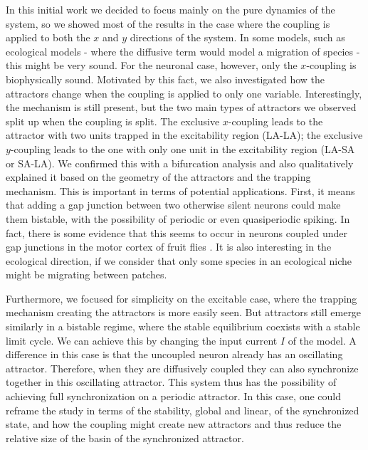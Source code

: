 In this initial work we decided to focus mainly on the pure dynamics of the system, so we showed most of the results in the case where the coupling is applied to both the $x$ and $y$ directions of the system. In some models, such as ecological models - where the diffusive term would model a migration of species - this might be very sound. For the neuronal case, however, only the $x$-coupling is biophysically sound. Motivated by this fact, we also investigated how the attractors change when the coupling is applied to only one variable. Interestingly, the mechanism is still present, but the two main types of attractors we observed split up when the coupling is split. The exclusive $x$-coupling leads to the attractor with two units trapped in the excitability region (LA-LA); the exclusive $y$-coupling leads to the one with only one unit in the excitability region (LA-SA or SA-LA). We confirmed this with a bifurcation analysis and also qualitatively explained it based on the geometry of the attractors and the trapping mechanism. This is important in terms of potential applications. First, it means that adding a gap junction between two otherwise silent neurons could make them bistable, with the possibility of periodic or even quasiperiodic spiking. In fact, there is some evidence that this seems to occur in neurons coupled under gap junctions in the motor cortex of fruit flies \cite{hurkey2023gap}. It is also interesting in the ecological direction, if we consider that only some species in an ecological niche might be migrating between patches.

Furthermore, we focused for simplicity on the excitable case, where the trapping mechanism creating the attractors is more easily seen. But attractors still emerge similarly in a bistable regime, where the stable equilibrium coexists with a stable limit cycle. We can achieve this by changing the input current $I$ of the model. A difference in this case is that the uncoupled neuron already has an oscillating attractor. Therefore, when they are diffusively coupled they can also synchronize together in this oscillating attractor. This system thus has the possibility of achieving full synchronization on a periodic attractor. In this case, one could reframe the study in terms of the stability, global and linear, of the synchronized state, and how the coupling might create new attractors and thus reduce the relative size of the basin of the synchronized attractor.

